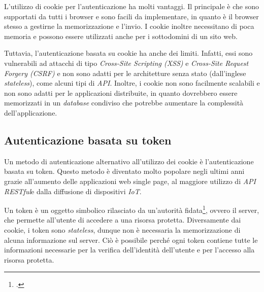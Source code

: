 \noindent L'utilizzo di cookie per l'autenticazione ha molti vantaggi.
Il principale è che sono supportati da tutti i browser e sono facili da implementare, in quanto è il browser stesso a gestirne la memorizzazione e l'invio.
I cookie inoltre necessitano di poca memoria e possono essere utilizzati anche per i sottodomini di un sito web.

Tuttavia, l'autenticazione basata su cookie ha anche dei limiti.
Infatti, essi sono vulnerabili ad attacchi di tipo \emph{Cross-Site Scripting (XSS)} e \emph{Cross-Site Request Forgery (CSRF)} e non sono adatti per le architetture senza stato (dall'inglese \emph{stateless}), come alcuni tipi di \emph{\gls{API}}\glsfirstoccur.
Inoltre, i cookie non sono facilmente scalabili e non sono adatti per le applicazioni distribuite, in quanto dovrebbero essere memorizzati in un \emph{database} condiviso che potrebbe aumentare la complessità dell'applicazione.

\subsection{Autenticazione basata su token}
Un metodo di autenticazione alternativo all'utilizzo dei cookie è l'autenticazione basata su token.
Questo metodo è diventato molto popolare negli ultimi anni grazie all'aumento delle applicazioni web single page, al maggiore utilizzo di \emph{\gls{API RESTful}}\glsfirstoccur e dalla diffusione di dispositivi \emph{\gls{IoT}}\glsfirstoccur.

Un token è un oggetto simbolico rilasciato da un'autorità fidata\footcite{site:token-based-authentication-cloudflare}, ovvero il server, che permette all'utente di accedere a una risorsa protetta.
Diversamente dai cookie, i token sono \emph{stateless}, dunque non è necessaria la memorizzazione di alcuna informazione sul server.
Ciò è possibile perché ogni token contiene tutte le informazioni necessarie per la verifica dell'identità dell'utente e per l'accesso alla risorsa protetta. \\

